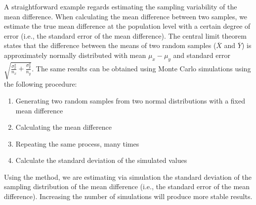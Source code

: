 \documentclass[
  man,floatsintext]{apa6}
\providecommand{\tightlist}{%
  \setlength{\itemsep}{0pt}\setlength{\parskip}{0pt}}
\begin{document}
A straightforward example regards estimating the sampling variability of the mean difference. When calculating the mean difference between two samples, we estimate the true mean difference at the population level with a certain degree of error (i.e., the standard error of the mean difference). The central limit theorem states that the difference between the means of two random samples (\(\overline{X}\) and \(\overline{Y}\)) is approximately normally distributed with mean \(\mu_{x} - \mu_{y}\) and standard error \(\sqrt{\frac{\sigma^2_x}{{n_x}} + \frac{\sigma^2_y}{{n_y}}}\). The same results can be obtained using Monte Carlo simulations using the following procedure:

\begin{enumerate}
\def\labelenumi{\arabic{enumi}.}
\tightlist
\item
  Generating two random samples from two normal distributions with a fixed mean difference
\item
  Calculating the mean difference
\item
  Repeating the same process, many times
\item
  Calculate the standard deviation of the simulated values
\end{enumerate}

Using the method, we are estimating via simulation the standard deviation of the sampling distribution of the mean difference (i.e., the standard error of the mean difference). Increasing the number of simulations will produce more stable results.

\scriptsize
\end{document}
